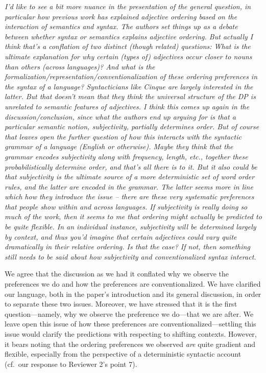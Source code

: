 \documentclass[12pt]{article}
\begin{document}
\item \emph{I'd like to see a bit more nuance in the presentation of the general question, in particular how previous work has explained adjective ordering based on the interaction of semantics and syntax. The authors set things up as a debate between whether syntax or semantics explains adjective ordering. But actually I think that's a conflation of two distinct (though related) questions: What is the ultimate explanation for why certain (types of) adjectives occur closer to nouns than others (across languages)? And what is the formalization/representation/conventionalization of these ordering preferences in the syntax of a language? Syntacticians like Cinque are largely interested in the latter. But that doesn't mean that they think the universal structure of the DP is unrelated to semantic features of adjectives.
I think this comes up again in the discussion/conclusion, since what the authors end up arguing for is that a particular semantic notion, subjectivity, partially determines order. But of course that leaves open the further question of how this interacts with the syntactic grammar of a language (English or otherwise). Maybe they think that the grammar encodes subjectivity along with frequency, length, etc., together these probabilistically determine order, and that's all there is to it. But it also could be that subjectivity is the ultimate source of a more deterministic set of word order rules, and the latter are encoded in the grammar. The latter seems more in line which how they introduce the issue -- there are these very systematic preferences that people show within and across languages. If subjectivity is really doing so much of the work, then it seems to me that ordering might actually be predicted to be quite flexible. In an individual instance, subjectivity will be
determined largely by context, and thus you'd imagine that certain adjectives could vary quite dramatically in their relative ordering. Is that the case? If not, then something still needs to be said about how subjectivity and conventionalized syntax interact.}

We agree that the discussion as we had it conflated why we observe the preferences we do and how the preferences are conventionalized. We have clarified our language, both in the paper's introduction and its general discussion, in order to separate these two issues. Moreover, we have stressed that it is the first question---namely, why we observe the preference we do---that we are after. We leave open this issue of how these preferences are conventionalized---settling this issue would clarify the predictions with respecting to shifting contexts. However, it bears noting that the ordering preferences we observed \emph{are} quite gradient and flexible, especially from the perspective of a deterministic syntactic account (cf.~our response to Reviewer 2's point 7).
\end{document}
